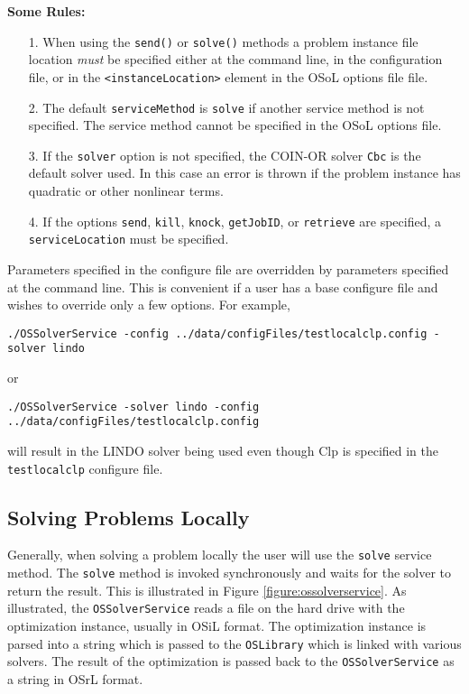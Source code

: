 \documentclass[11pt]{article}
\newcounter{Fig}
\renewcommand{\_}{{\char"5F}}
\renewcommand{\{}{{\char"7B}}
\renewcommand{\}}{{\char"7D}}
\renewcommand{\^}{{\char"0D}}
\renewcommand{\'}{{\char"0D}}
\begin{document}
{\bf Some Rules:}

\begin{itemize}
\item[1.]  When using the {\tt send()} or  {\tt solve()} methods a problem instance file location {\it must} be specified either at  the command line, in the configuration file, or in the {\tt <instanceLocation>} element in the OSoL options file file.

\item[2.]  The default {\tt serviceMethod} is {\tt solve} if another service method is not specified.   The service method cannot be specified in the OSoL options file.

\item [3.]  If the {\tt solver} option is not specified, the COIN-OR solver {\tt Cbc} is the default solver used. In this case an error is thrown if the problem instance has quadratic or other nonlinear terms.

\item[4.]  If the options {\tt send}, {\tt kill}, {\tt knock},  {\tt getJobID},  or {\tt retrieve} are specified, a  {\tt serviceLocation} must be specified.

\end{itemize}



Parameters specified in the configure file are overridden by parameters specified at the command line. This is convenient if a user has a base configure file and wishes to override only a few options. For example,
\begin{verbatim}
./OSSolverService -config ../data/configFiles/testlocalclp.config -solver lindo
\end{verbatim}
or
\begin{verbatim}
./OSSolverService -solver lindo -config ../data/configFiles/testlocalclp.config
\end{verbatim}
will result in the LINDO solver being used even though Clp is specified in the {\tt testlocalclp} configure file.



\subsection{Solving Problems Locally}

Generally, when solving a problem locally the user will use the {\tt solve} service method. The {\tt solve} method is invoked synchronously and waits for the solver to return the result.  This is illustrated in Figure \ref{figure:ossolverservice}. As illustrated, the {\tt OSSolverService} reads a file on the hard drive with the optimization instance, usually in OSiL format. The optimization instance is parsed into a string which is passed to the {\tt OSLibrary} which is linked with various solvers. The result of the optimization is passed back to the {\tt OSSolverService} as a string in OSrL format.
\end{document}
